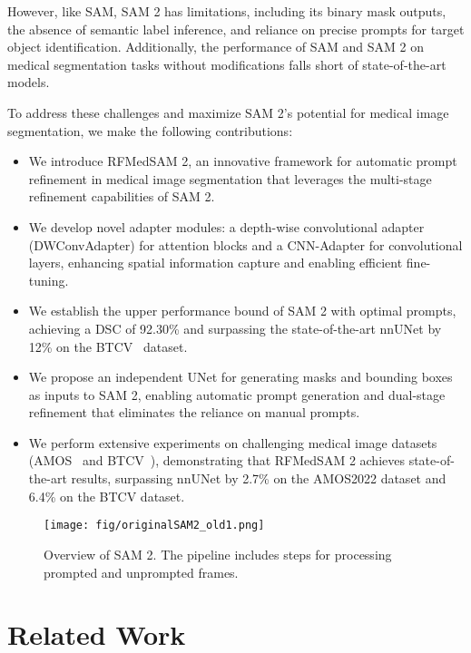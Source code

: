 However, like SAM, SAM 2 has limitations, including its binary mask outputs, the absence of semantic label inference, and reliance on precise prompts for target object identification. Additionally, the performance of SAM and SAM 2 on medical segmentation tasks without modifications falls short of state-of-the-art models.

To address these challenges and maximize SAM 2’s potential for medical image segmentation, we make the following contributions:
%
\begin{itemize}[leftmargin=*]
\item We introduce RFMedSAM 2, an innovative framework for automatic prompt refinement in medical image segmentation that leverages the multi-stage refinement capabilities of SAM 2.
\item We develop novel adapter modules: a depth-wise convolutional adapter (DWConvAdapter) for attention blocks and a CNN-Adapter for convolutional layers, enhancing spatial information capture and enabling efficient fine-tuning.
\item We establish the upper performance bound of SAM 2 with optimal prompts, achieving a DSC of 92.30\% and surpassing the state-of-the-art nnUNet by 12\% on the BTCV~\cite{landman2015miccai} dataset.
\item We propose an independent UNet for generating masks and bounding boxes as inputs to SAM 2, enabling automatic prompt generation and dual-stage refinement that eliminates the reliance on manual prompts.
\item We perform extensive experiments on challenging medical image datasets (AMOS~\cite{ji2022amos} and BTCV~\cite{landman2015miccai}), demonstrating that RFMedSAM 2 achieves state-of-the-art results, surpassing nnUNet by 2.7\% on the AMOS2022 dataset and 6.4\% on the BTCV dataset.
\end{itemize}


\begin{figure*}[!t]
\centering
  \vspace{-0.6cm}
\texttt{[image: fig/originalSAM2\_old1.png]}
      \caption{Overview of SAM 2. The pipeline includes steps for processing prompted and unprompted frames.}
\vspace{-0.2cm}
\label{fig:originalSAM2}
\end{figure*}


\section{Related Work}
\label{sec:related}

